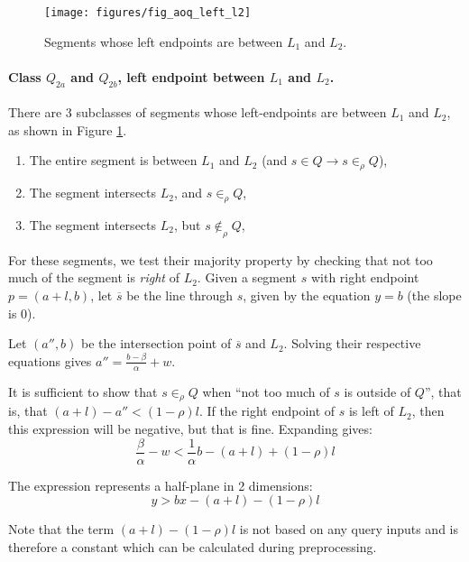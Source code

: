 
\begin{figure}[t]
\begin{center}
  \texttt{[image: figures/fig\_aoq\_left\_l2]}
  \caption{Segments whose left endpoints are between $L_1$ and $L_2$.}
  \label{fig:slabs:one:aoq_left_l2}
\end{center}
\end{figure}

\paragraph{Class $Q_{2a}$ and $Q_{2b}$, left endpoint between $L_1$ and $L_2$.}
There are 3 subclasses of segments whose left-endpoints are between $L_1$ and $L_2$, as shown in Figure \ref{fig:slabs:one:aoq_left_l2}.
\begin{enumerate}
 \item The entire segment is between $L_1$ and $L_2$ (and $s \in Q \rightarrow s \in_\rho Q$),

 \item The segment intersects $L_2$, and $s \in_\rho Q$,

 \item The segment intersects $L_2$, but $s \not \in_\rho Q$,

\end{enumerate}

For these segments, we test their majority property by checking that not too much of the segment is \emph{right} of $L_2$. Given a segment $s$ with right endpoint $p = (a+l,b)$, let $\overline{s}$ be the line through $s$, given by the equation $y = b$ (the slope is 0).

Let $(a'', b)$ be the intersection point of $\overline{s}$ and $L_2$. Solving their respective equations gives $a'' = \frac{b - \beta}{\alpha} + w$.

It is sufficient to show that $s \in_\rho Q$ when ``not too much of $s$ is outside of $Q$'', that is, that $(a + l) - a'' < (1 - \rho)l$. If the right endpoint of $s$ is left of $L_2$, then this expression will be negative, but that is fine. Expanding gives:
\[
\frac{\beta}{\alpha} - w < \frac{1}{\alpha} b - (a + l) + (1 - \rho)l 
\]

\noindent
The expression represents a half-plane in 2 dimensions:
\[
y > bx - (a + l) - (1 - \rho)l 
\]

Note that the term $(a + l) - (1 - \rho)l$ is not based on any query inputs and is therefore a constant which can be calculated during preprocessing.



